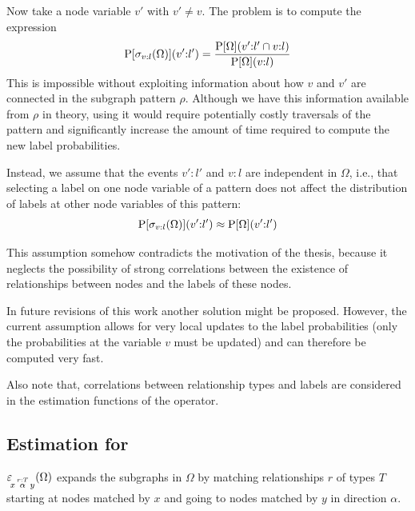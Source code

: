 Now take a node variable $v'$ with $v' \not = v$.
The problem is to compute the expression
\begin{align}
\begin{split}
  \operatorname{P}[\sigma_{v:l}(\Omega)](v'{:}l')
    &= \frac{\operatorname{P}[\Omega](v'{:}l' \cap v{:}l)}{\operatorname{P}[\Omega](v{:}l)} \\
\end{split}
\end{align}
This is impossible without exploiting information about how $v$ and
$v'$ are connected in the subgraph pattern $\rho$.
Although we have this information available from $\rho$ in theory, using it
would require potentially costly traversals of the pattern and significantly
increase the amount of time required to compute the new label probabilities.

Instead, we assume that the events $v'{:}l'$ and $v{:}l$ are independent in
$\Omega$, i.e., that selecting a label on one node variable of a pattern does
not affect the distribution of labels at other node variables of this pattern:
\begin{align}
\begin{split}
  \operatorname{P}[\sigma_{v:l}(\Omega)](v'{:}l') \approx \operatorname{P}[\Omega](v'{:}l')
\end{split}
\end{align}

\begin{remark}
This assumption somehow contradicts the motivation of the thesis, because it
neglects the possibility of strong correlations between the existence of
relationships between nodes and the labels of these nodes.

In future revisions of this work another solution might be proposed.
However, the current assumption allows for very local updates to the
label probabilities (only the probabilities at the variable $v$ must be
updated) and can therefore be computed very fast.

Also note that, correlations between relationship types and labels are
considered in the estimation functions of the  operator.
\end{remark}

\subsection{Estimation for }

$\varepsilon\!_{x\, \overset{r:T}{\alpha} \, y}(\Omega)$ expands the subgraphs in $\Omega$
by matching relationships $r$ of types $T$ starting at nodes matched by $x$
and going to nodes matched by $y$ in direction $\alpha$.

